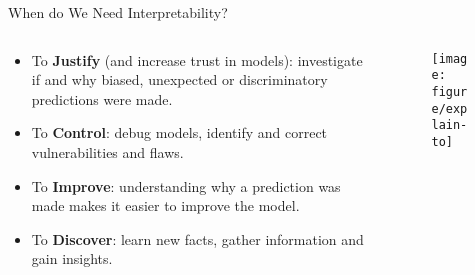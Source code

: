 \documentclass[aspectratio=169]{../latex_main/tntbeamer}  %
\begin{document}
	
	\begin{frame}[c]{When do We Need Interpretability? 
		}
		\begin{columns}
			\begin{column}{0.6\textwidth}
				\begin{itemize}
					\item To \textbf{Justify} (and increase trust in models): investigate if and why biased, unexpected or discriminatory predictions were made.
					\pause
					\item To \textbf{Control}: debug models, identify and correct vulnerabilities and flaws.
					\pause
					\item To \textbf{Improve}: understanding why a prediction was made makes it easier to improve the model.
					\pause
					\item To \textbf{Discover}: learn new facts, gather information and gain insights.
				\end{itemize}
			\end{column}
			\begin{column}{0.6\textwidth}  
				\begin{center}
					\begin{figure}
						\texttt{[image: figure/explain-to]}
					\end{figure}
				\end{center}
			\end{column}
		\end{columns}

	\end{frame}
	
	
\end{document}

